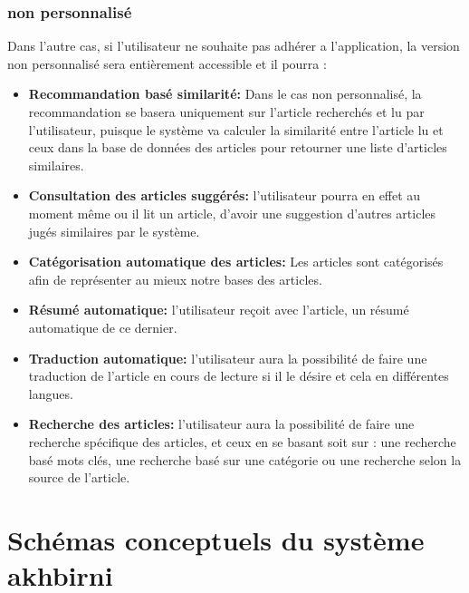 \subsubsection{non personnalisé}
Dans l'autre cas, si l'utilisateur ne souhaite pas adhérer a l'application, la version non personnalisé sera entièrement accessible et il pourra :

\begin{itemize}
    
    \item \textbf{Recommandation basé similarité:}
    Dans le cas non personnalisé, la recommandation se basera uniquement sur l'article recherchés et lu par l'utilisateur, puisque le système va calculer la similarité entre l'article lu et ceux dans la base de données des articles pour retourner une liste d'articles similaires.
    
    \item \textbf{Consultation des articles suggérés:}
    l'utilisateur pourra en effet au moment même ou il lit un article, d'avoir une suggestion d'autres articles jugés similaires par le système.
    
    \item \textbf{Catégorisation automatique des articles:}
    Les articles sont catégorisés afin de représenter au mieux notre bases des articles.
    
    \item \textbf{Résumé automatique:}
    l'utilisateur reçoit avec l'article, un résumé automatique de ce dernier.
    
    \item \textbf{Traduction automatique:}
    l'utilisateur aura la possibilité de faire une traduction de l'article en cours de lecture si il le désire et cela en différentes langues.
    
    \item \textbf{Recherche des articles:}
     l'utilisateur aura la possibilité de faire une recherche spécifique des articles, et ceux en se basant soit sur : une recherche basé mots clés, une recherche basé sur une catégorie ou une recherche selon la source de l'article. 
    
    
\end{itemize}

\section{Schémas conceptuels du système akhbirni}

